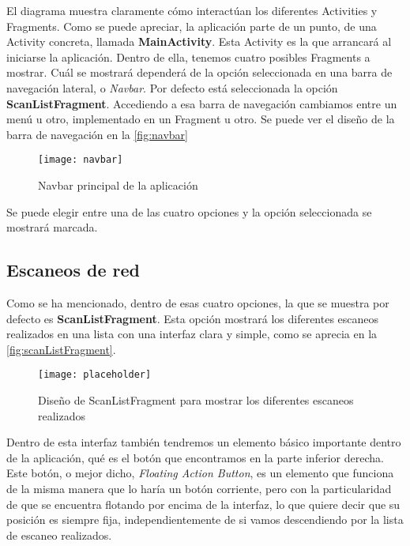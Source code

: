 El diagrama muestra claramente cómo interactúan los diferentes Activities y Fragments.  Como se puede apreciar, la aplicación parte de un punto, de una Activity concreta, llamada \textbf{MainActivity}. Esta Activity es la que arrancará al iniciarse la aplicación. Dentro de ella, tenemos cuatro posibles Fragments a mostrar. Cuál se mostrará dependerá de la opción seleccionada en una barra de navegación lateral, o \textit{Navbar}. Por defecto está seleccionada la opción \textbf{ScanListFragment}. Accediendo a esa barra de navegación cambiamos entre un menú u otro, implementado en un Fragment u otro. Se puede ver el diseño de la barra de navegación en la \autoref{fig:navbar}

\begin{figure}[H]
	\centering
	\texttt{[image: navbar]}
	\caption{Navbar principal de la aplicación}
	\label{fig:navbar}
\end{figure}

Se puede elegir entre una de las cuatro opciones y la opción seleccionada se mostrará marcada.

\subsection{Escaneos de red}

Como se ha mencionado, dentro de esas cuatro opciones, la que se muestra por defecto es \textbf{ScanListFragment}. Esta opción mostrará los diferentes escaneos realizados en una lista con una interfaz clara y simple, como se aprecia en la \autoref{fig:scanListFragment}.

\begin{figure}[H] %
	\centering
	\texttt{[image: placeholder]}
	\caption{Diseño de ScanListFragment para mostrar los diferentes escaneos realizados}
	\label{fig:scanListFragment}
\end{figure}

Dentro de esta interfaz también tendremos un elemento básico importante dentro de la aplicación, qué es el botón que encontramos en la parte inferior derecha. Este botón, o mejor dicho, \textit{Floating Action Button}, es un elemento que funciona de la misma manera que lo haría un botón corriente, pero con la particularidad de que se encuentra flotando por encima de la interfaz, lo que quiere decir que su posición es siempre fija, independientemente de si vamos descendiendo por la lista de escaneo realizados.

